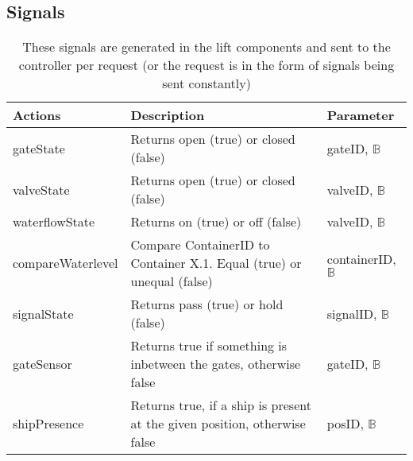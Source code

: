 		\subsection{Signals}
		\begin{table}[htbp]
			\centering
			\caption{These signals are generated in the lift components and sent to the controller per request (or the request is in the form of signals being sent constantly)}
			\begin{tabular}{lp{6cm}l}
				\toprule
				\textbf{Actions} & \textbf{Description} & \textbf{Parameter} \\
				\hline
				gateState & Returns open (true) or closed (false) & gateID, $ \mathbb{B} $ \\
				valveState & Returns open (true) or closed (false) & valveID, $ \mathbb{B} $ \\
				waterflowState & Returns on (true) or off (false) & valveID, $ \mathbb{B} $ \\
				compareWaterlevel & Compare ContainerID to Container X.1. Equal (true) or unequal (false) & containerID, $ \mathbb{B} $ \\
				signalState & Returns pass (true) or hold (false) & signalID, $ \mathbb{B} $ \\
				gateSensor &  Returns true if something is inbetween the gates, otherwise false & gateID, $ \mathbb{B} $ \\
				shipPresence  & Returns true, if a ship is present at the given position, otherwise false & posID, $ \mathbb{B} $ \\
				\bottomrule
			\end{tabular}%
				\label{tab:addlabel}%
				\end{table}%
				
				
